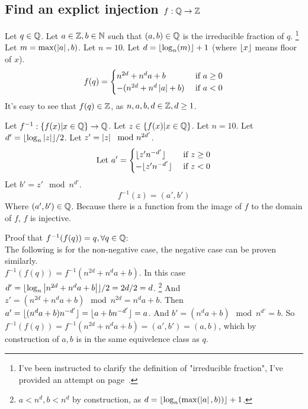\section{}
    \subsection{Find an explict injection $f: \mathbb{Q} \to \mathbb{Z}$}
        Let $q \in \mathbb{Q}$.
        Let $a \in \mathbb{Z}, b \in \mathbb{N}$ such that $(a,b) \in \mathbb{Q}$ is the irreducible fraction of $q$.
            \footnote{I've been instructed to clarify the definition of "irreducible fraction", 
            I've provided an attempt on page~\pageref{proof:IF}.}
        Let $m = \max(\left|a\right|,b)$.
        Let $n = 10$.
        Let $d = \lfloor \log_{n}(m) \rfloor + 1$ 
        (where $\lfloor x \rfloor$ means floor of $x$).
        \[
            f(q) = 
            \begin{cases}
                n^{2d} + n^d a + b & \text{ if $a \geq 0$} \\ 
                -(n^{2d} + n^d \left|a\right| + b) & \text{ if $a < 0$}
            \end{cases}
        \]
        It's easy to see that $f(q) \in\mathbb{Z}$, 
        as $n, a, b, d \in \mathbb{Z}, d \geq 1$.
        
        Let $f^{-1}: \{f(x) | x \in \mathbb{Q} \} \to \mathbb{Q}$.
        Let $z \in \{ f(x) | x \in \mathbb{Q} \}$.
        Let $n = 10$.
        Let $d' = \lfloor \log_n \left|z\right| \rfloor / 2$.
        Let $z' = \left|z\right| \mod n^{2d'}$.
        $$
            \text{Let } a' = 
            \begin{cases}
                \lfloor z' n^{-d'} \rfloor &\text{ if $z \geq 0$} \\ 
                -\lfloor z' n^{-d'} \rfloor &\text{ if $z < 0$}
            \end{cases}
        $$
        Let $b' = z' \mod n^{d'}$.
        \[
            f^{-1}(z) = (a',b')
        \]
        Where $(a',b') \in \mathbb{Q}$.
        Because there is a function from the image of $f$ to the domain of $f$,
        $f$ is injective.

        Proof that $f^{-1}(f(q)) = q, \forall q \in \mathbb{Q}$: \\ 
        The following is for the non-negative case, the negative case can be proven similarly. \\ 
        $f^{-1}(f(q)) = f^{-1}(n^{2d} + n^d a + b)$.
        In this case $d' = \lfloor \log_n \left|n^{2d} + n^d a + b\right| \rfloor / 2 = 2d / 2 = d$.
        \footnote{$a < n^d, b < n^d$ by construction, as $d = \lfloor \log_n(\max(\left|a\right|, b)) \rfloor + 1$.}
        And $z' = (n^{2d} + n^d a + b) \mod n^{2d} = n^d a + b$.
        Then $a' = \lfloor (n^d a + b) n^{-d'} \rfloor = \lfloor a + b n^{-d'} \rfloor = a$.
        And $b' = (n^d a + b) \mod n^{d'} = b$.
        So $f^{-1}(f(q)) = f^{-1}(n^{2d} + n^d a + b) = (a', b') = (a, b)$,
        which by construction of $a,b$ is in the same equivelence class as $q$.

